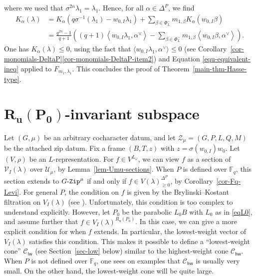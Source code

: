 \documentclass[11pt]{amsart}
\numberwithin{equation}{section}
\theoremstyle{definition}
\theoremstyle{remark}
\newcommand{\GZip}{\mathop{\text{$G$-{\tt Zip}}}\nolimits}
\newcommand{\lwsf}{\mathsf{lw}}
\newcommand{\hwsf}{\mathsf{hw}}
\newcommand{\Ccal}{{\mathcal C}}
\newcommand{\Ucal}{{\mathcal U}}
\newcommand{\Vcal}{{\mathcal V}}
\newcommand{\Zcal}{{\mathcal Z}}
\newcommand{\FF}{\mathbb{F}}
\begin{document}
where we used that $\sigma^{2n}\lambda_1 =\lambda_1$. Hence, for all $\alpha\in \Delta^P$, we find 
\begin{align}
K_\alpha(\lambda)&=K_\alpha\left(q \sigma^{-1}(\lambda_1)-w_{0,I}\lambda_1\right) + \sum_{\beta\in \Phi^{-}_{L}}m_{1,\beta} K_\alpha(w_{0,I} \beta) \\
&=\frac{q^{2n}-1}{q+1}\left((q+1)\left\langle w_{0,I}\lambda_1, \alpha^\vee \right\rangle-\sum_{\beta\in \Phi^{-}_{L}}m_{1,\beta}\left\langle w_{0,I}\beta, \alpha^\vee \right\rangle \right).
\end{align}
One has $K_\alpha(\lambda)\leq 0$, using the fact that $\langle w_{0,I}\lambda_1,\alpha^\vee \rangle \leq 0$ (see Corollary~\ref{cor-monomials-DeltaP}\eqref{cor-monomials-DeltaP-item2}) and Equation \eqref{equ-equivalent-ineq} applied to $F_{m_1,\lambda_1}$. This concludes the proof of Theorem~\ref{main-thm-Hasse-type}.


\section{\texorpdfstring{$\boldsymbol{R_{\textrm{u}}(P_0)}$}{R\textunderscore u (P)}-invariant subspace{}}\label{sec5}

Let $(G,\mu)$ be an arbitrary cocharacter datum, and let $\Zcal_\mu=(G,P,L,Q,M)$ be the attached zip datum. Fix a frame $(B,T,z)$ with $z=\sigma(w_{0,I})w_0$. Let $(V,\rho)$ be an $L$-representation. For $f\in V^{L_\varphi}$, we can view $f$ as a section of $\Vcal_I(\lambda)$ over $\Ucal_\mu$, by Lemma~\ref{lem-Umu-sections}. When $P$ is defined over $\FF_q$, this section extends to $\GZip^\mu$ if and only if $f\in V(\lambda)^{\Delta^P}_{\geq 0}$, by Corollary~\ref{cor-Fq-Levi}. For general $P$, the condition on $f$ is given by the Brylinski--Kostant filtration on $V_I(\lambda)$ (see \cite[Theorem 3.4.1]{Imai-Koskivirta-vector-bundles}). Unfortunately, this condition is too complex to understand explicitly. However, let $P_0$ be the parabolic $L_0B$ with $L_0$ as in \eqref{eqL0}, and assume further that $f\in V_I(\lambda)^{R_{\textrm{u}}(P_0)}$. In this case, we can give a more explicit condition for when $f$ extends. In particular, the lowest-weight vector of $V_I(\lambda)$ satisfies this condition. This makes it possible to define a ``lowest-weight cone'' $\Ccal_{\lwsf}$ (see Section~\ref{sec-low} below) similar to the highest-weight cone $\Ccal_{\hwsf}$. When $P$ is not defined over $\FF_q$, one sees on examples that $\Ccal_{\hwsf}$ is usually very small. On the other hand, the lowest-weight cone will be quite large.
\end{document}
